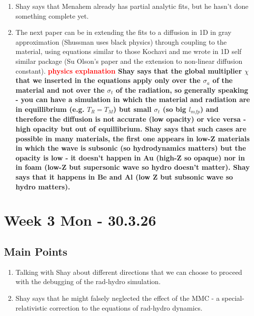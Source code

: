 \documentclass[11pt]{article}
\begin{document}
\begin{enumerate}
\begin{enumerate}
\begin{enumerate}
            \item Shay says that Menahem already has partial analytic fits, but he hasn't done something complete yet.
            \item The next paper can be in extending the fits to a diffusion in 1D in gray approximation (Shussman uses black physics) through coupling to the material, using equations similar to those Kochavi and me wrote in 1D self similar package (Su Olson's paper and the extension to non-linear diffusion constant).
            \textbf{\textcolor{red}{physics explanation} Shay says that the global multiplier $\chi$ that we inserted in the equations apply only over the $\sigma_a$ of the material and not over the $\sigma_t$ of the radiation, so generally speaking - you can have a simulation in which the material and radiation are in equillibrium (e.g. $T_R = T_M$) but small $\sigma_t$ (so big $l_{mfp}$) and therefore the diffusion is not accurate (low opacity) or vice versa - high opacity but out of equillibrium. Shay says that such cases are possible in many materials, the first one appears in low-Z materials in which the wave is subsonic (so hydrodynamics matters) but the opacity is low - it doesn't happen in Au (high-Z so opaque) nor in in foam (low-Z but supersonic wave so hydro doesn't matter). Shay says that it happens in Be and Al (low Z but subsonic wave so hydro matters).}
        \end{enumerate}
    \end{enumerate}
\end{enumerate}
\section{Week 3 Mon - 30.3.26}
\subsection{Main Points}
    \begin{enumerate}
        \item Talking with Shay about different directions that we can choose to proceed with the debugging of the rad-hydro simulation.
        \item Shay says that he might falsely neglected the effect of the MMC - a special-relativistic correction to the equations of rad-hydro dynamics.
    \end{enumerate}
\end{document}
